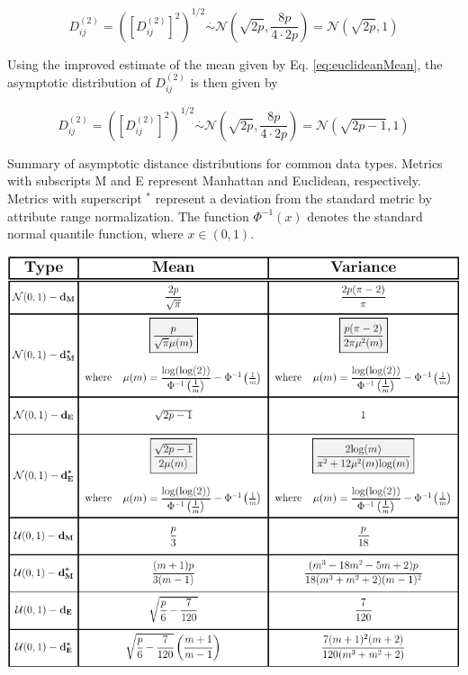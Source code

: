 \documentclass[10pt,letterpaper]{article}\usepackage[]{graphicx}\usepackage[]{color}
\begin{document}
\begin{equation}\label{eq:normalEucDistr}
D^{(2)}_{ij} = \left(\left[D^{(2)}_{ij}\right]^2\right)^{1/2} \overset{.}{\sim} \mathcal{N}\left(\sqrt{2p},\frac{8p}{4 \cdot 2p}\right) = \mathcal{N}(\sqrt{2p},1)
\end{equation}

Using the improved estimate of the mean given by Eq. \ref{eq:euclideanMean}, the asymptotic distribution of $D^{(2)}_{ij}$ is then given by

\begin{equation}\label{eq:normalEucDistr2}
D^{(2)}_{ij} = \left(\left[D^{(2)}_{ij}\right]^2\right)^{1/2} \overset{.}{\sim} \mathcal{N}\left(\sqrt{2p},\frac{8p}{4 \cdot 2p}\right) = \mathcal{N}(\sqrt{2p - 1},1)
\end{equation}

\begin{table}[H]
\caption{Summary of asymptotic distance distributions for common data types. Metrics with subscripts M and E represent Manhattan and Euclidean, respectively. Metrics with superscript $^*$ represent a deviation from the standard metric by attribute range normalization. The function $\Phi^{-1}(x)$ denotes the standard normal quantile function, where $x \in (0,1)$.}
\label{tab:dist_distr_common}
\centering
\includegraphics[width=\textwidth]{typical_data-metric_tab.pdf}
\end{table}
\end{document}
